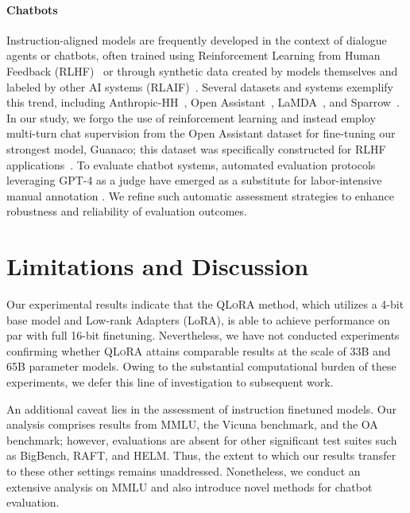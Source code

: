 \paragraph{Chatbots} Instruction-aligned models are frequently developed in the context of dialogue agents or chatbots, often trained using Reinforcement Learning from Human Feedback (RLHF)~\citep{christiano2017deep} or through synthetic data created by models themselves and labeled by other AI systems (RLAIF)~\citep{bai2022constitutional}. Several datasets and systems exemplify this trend, including Anthropic-HH~\citep{askell2021general,bai2022training}, Open Assistant~\citep{kopf2023openassistant}, LaMDA~\citep{thoppilan2022lamda}, and Sparrow~\citep{glaese2022improving}. In our study, we forgo the use of reinforcement learning and instead employ multi-turn chat supervision from the Open Assistant dataset for fine-tuning our strongest model, Guanaco; this dataset was specifically constructed for RLHF applications~\citep{kopf2023openassistant}. To evaluate chatbot systems, automated evaluation protocols leveraging GPT-4 as a judge have emerged as a substitute for labor-intensive manual annotation \citep{vicuna2023,peng2023instruction}. We refine such automatic assessment strategies to enhance robustness and reliability of evaluation outcomes.

\section{Limitations and Discussion}

Our experimental results indicate that the \textsc{QLoRA} method, which utilizes a 4-bit base model and Low-rank Adapters (LoRA), is able to achieve performance on par with full 16-bit finetuning. Nevertheless, we have not conducted experiments confirming whether \textsc{QLoRA} attains comparable results at the scale of 33B and 65B parameter models. Owing to the substantial computational burden of these experiments, we defer this line of investigation to subsequent work.

An additional caveat lies in the assessment of instruction finetuned models. Our analysis comprises results from MMLU, the Vicuna benchmark, and the OA benchmark; however, evaluations are absent for other significant test suites such as BigBench, RAFT, and HELM. Thus, the extent to which our results transfer to these other settings remains unaddressed. Nonetheless, we conduct an extensive analysis on MMLU and also introduce novel methods for chatbot evaluation.


